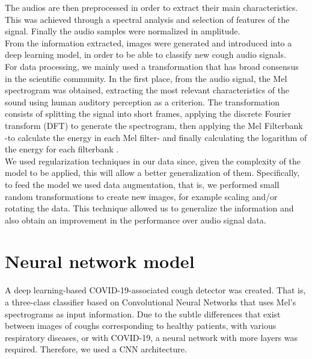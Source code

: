 \documentclass{nle}
\begin{document}
The audios are then preprocessed in order to extract their main characteristics. This was achieved through a spectral analysis and selection of features of the signal. Finally the audio samples were normalized in amplitude.\\

From the information extracted, images were generated and introduced into a deep learning model, in order to be able to classify new cough audio signals.\\

For data processing, we mainly used a transformation that has broad consensus in the scientific community. In the first place, from the audio signal, the Mel \cite{27} spectrogram was obtained, extracting the most relevant characteristics of the sound using human auditory perception as a criterion. The transformation consists of splitting the signal into short frames, applying the discrete Fourier transform (DFT) to generate the spectrogram, then applying the Mel Filterbank -to calculate the energy in each Mel filter- and finally calculating the logarithm of the energy for each filterbank \cite{28}.\\

We used regularization techniques in our data since, given the complexity of the model to be applied, this will allow a better generalization of them. Specifically, to feed the model we used data augmentation, that is, we performed small random transformations to create new images, for example scaling and/or rotating the data. This technique allowed us to generalize the information and also obtain an improvement in the performance over audio signal data.

\section{Neural network model}

A deep learning-based COVID-19-associated cough detector was created. That is, a three-class classifier based on Convolutional Neural Networks that uses Mel's spectrograms as input information. Due to the subtle differences that exist between images of coughs corresponding to healthy patients, with various respiratory diseases, or with COVID-19, a neural network with more layers was required. Therefore, we used a CNN architecture.
\end{document}

